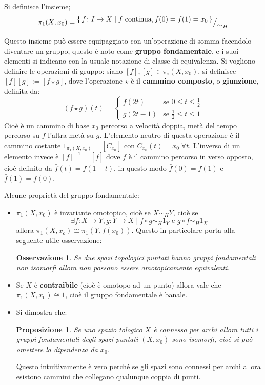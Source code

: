 \documentclass[10pt, twoside=false, x11names]{scrbook}
\newtheorem{proposition}[theorem]{Proposizione}
\newtheorem{osservation}[theorem]{Osservazione}
\newcommand{\vedi}[1]{\emph{vedi} #1}
\newcommand*\quot[2]{{^{\textstyle #1}\big/_{\textstyle #2}}}
\begin{document}
Si definisce l'insieme;
\[
  \pi_1(X,x_0) = \quot{\set{f \colon I \to X | f \text{ continua}, f(0) = f(1) = x_0}}{\sim_H}
\]

Questo insieme può essere equipaggiato con un'operazione di somma facendolo diventare un gruppo,
questo è noto come \textbf{gruppo fondamentale}, e i suoi elementi
si indicano con la usuale notazione di classe di equivalenza.
Si vogliono definire le operazioni di gruppo:
siano $ [f], [g] \in \pi_i(X,x_0) $, si definisce $ [f][g] := [f \star g] $, dove l'operazione $ \star $ è
il \textbf{cammino composto}, o \textbf{giunzione}, 
\index{Giunzione!\vedi{Cammino composto}} definita da:
\[
  (f \star g)(t) =
  \begin{cases}
    f(2t) & \text{se } 0 \leq t \leq \frac{1}{2} \\
    g(2t -1) & \text{se } \frac{1}{2} \leq t \leq 1
  \end{cases}
\]
Cioè è un cammino di base $ x_0 $ percorso a velocità doppia, metà del tempo
percorso su $ f $ l'altra metà su $ g $.
L'elemento neutro di questa operazione è il cammino costante $ 1_{\pi_1(X,x_0)} = [C_{x_0}] $ con
$ C_{x_0}(t) = x_0 \; \forall t $.
L'inverso di un elemento invece è $ [f]^{-1} = [\bar{f}] $ dove $ \bar{f} $ è il
cammino percorso in verso opposto, cioè definito da $ \bar{f}(t) = f(1-t) $, in
questo modo $ \bar{f}(0) = f(1) $ e $ \bar{f}(1) = f(0) $.

Alcune proprietà del gruppo fondamentale:
\begin{itemize}
\item $ \pi_1(X,x_0) $ è invariante omotopico, cioè se $ X \sim_H Y $, cioè se
  \[
    \exists f: X \to Y, g: Y \to X \; | \; f \circ g \sim_H 1_Y \text{ e }  g \circ f \sim_H 1_X
  \]
  allora $ \pi_1(X,x_o) \cong \pi_1(Y,f(x_0)) $. Questo in particolare porta alla seguente
  utile osservazione:
  \begin{osservation}
    Se due spazi topologici puntati hanno gruppi fondamentali non isomorfi allora
    non possono essere omotopicamente equivalenti.
  \end{osservation}
\item Se $ X $ è \textbf{contraibile} (cioè è
  omotopo ad un punto) allora vale che $ \pi_1(X,x_0) \cong 1 $, cioè il gruppo
  fondamentale è banale.
\item Si dimostra che:
  \begin{proposition}
    Se uno spazio tologico $ X $ è connesso per archi allora tutti i gruppi fondamentali
    degli spazi puntati $ (X,x_0) $ sono isomorfi, cioè si può omettere la dipendenza da $ x_0 $.
  \end{proposition}
  Questo intuitivamente è vero perché se gli spazi sono connessi per archi allora esistono cammini
  che collegano qualunque coppia di punti.
\end{itemize}
\end{document}
